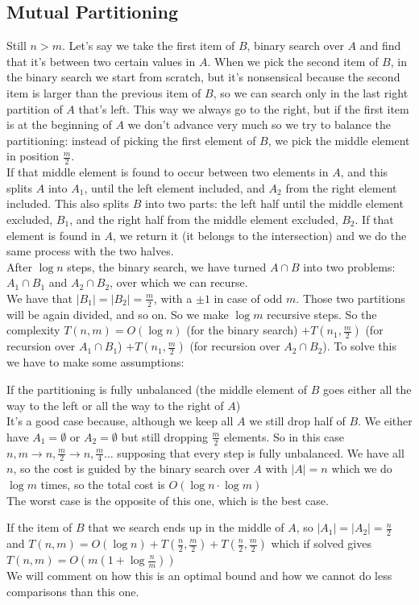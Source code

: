 \documentclass[10pt]{report}
\begin{document}
\subsection{Mutual Partitioning} Still $n > m$. Let's say we take the first item of $B$, binary search over $A$ and find that it's between two certain values in $A$. When we pick the second item of $B$, in the binary search we start from scratch, but it's nonsensical because the second item is larger than the previous item of $B$, so we can search only in the last right partition of $A$ that's left. This way we always go to the right, but if the first item is at the beginning of $A$ we don't advance very much so we try to balance the partitioning: instead of picking the first element of $B$, we pick the middle element in position $\frac{m}{2}$.\\ If that middle element is found to occur between two elements in $A$, and this splits $A$ into $A_1$, until the left element included, and $A_2$ from the right element included. This also splits $B$ into two parts: the left half until the middle element excluded, $B_1$, and the right half from the middle element excluded, $B_2$. If that element is found in $A$, we return it (it belongs to the intersection) and we do the same process with the two halves.\\
After $\log n$ steps, the binary search, we have turned $A \cap B$ into two problems: $A_1 \cap B_1$ and $A_2 \cap B_2$, over which we can recurse.\\
We have that $|B_1| = |B_2| = \frac{m}{2}$, with a $\pm 1$ in case of odd $m$. Those two partitions will be again divided, and so on. So we make $\log m$ recursive steps. So the complexity $T(n, m) = O(\log n)$ (for the binary search) $+ T(n_1, \frac{m}{2})$ (for recursion over $A_1 \cap B_1$) $+ T(n_1, \frac{m}{2})$ (for recursion over $A_2\cap B_2$). To solve this we have to make some assumptions:
\begin{list}{}{}
	\item If the partitioning is fully unbalanced (the middle element of $B$ goes either all the way to the left or all the way to the right of $A$)\\
	 It's a good case because, although we keep all $A$ we still drop half of $B$. We either have $A_1 = \emptyset$ or $A_2 = \emptyset$ but still dropping $\frac{m}{2}$ elements. So in this case $n,m \rightarrow n, \frac{m}{2}\rightarrow n, \frac{m}{4}\ldots$ supposing that every step is fully unbalanced. We have all $n$, so the cost is guided by the binary search over $A$ with $|A| = n$ which we do $\log m$ times, so the total cost is $O(\log n \cdot \log m)$\\
	 The worst case is the opposite of this one, which is the best case.
	 \item If the item of $B$ that we search ends up in the middle of $A$, so $|A_1| = |A_2| = \frac{n}{2}$ and $T(n, m) = O(\log n) + T(\frac{n}{2}, \frac{m}{2}) + T(\frac{n}{2}, \frac{m}{2})$ which if solved gives $T(n, m) = O(m(1 + \log\frac{n}{m}))$\\
	 We will comment on how this is an optimal bound and how we cannot do less comparisons than this one.
\end{list}
\end{document}
